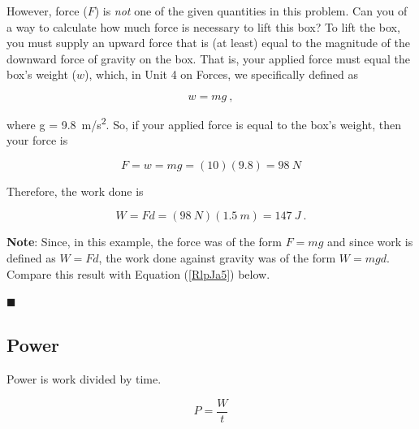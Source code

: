 \documentclass[dvipsnames]{article}
\begin{document}
However, force ($F$) is \textit{not} one of the given quantities in this problem. Can you of a way to calculate how much force is necessary to lift this box? To lift the box, you must supply an upward force that is (at least) equal to the magnitude of the downward force of gravity on the box. That is, your applied force must equal the box's weight ($w$), which, in Unit 4 on Forces, we specifically defined as

\begin{equation*}
    w = m g\ ,
\end{equation*}

where  g = \SI{9.8}{m/s^2}. So, if your applied force is equal to the box's weight, then your force is

\begin{equation*}
    F = w = mg = (10)(9.8) = \SI{98}{N}
\end{equation*}

Therefore, the work done is

\begin{equation*}
    W = F d = (\SI{98}{N})(\SI{1.5}{m}) = \SI{147}{J} \ .
\end{equation*}

\textbf{Note}: Since, in this example, the force was of the form $F = mg$ and since work is defined as $W = F d$, the work done against gravity was of the form $W = mgd$. Compare this result with Equation (\ref{RlpJa5}) below.

\hfill $\blacksquare$

\begin{center}
\end{center}

\subsection{Power}
Power is work divided by time.

\begin{equation}
    P = \frac{W}{t}
\end{equation}
\end{document}
